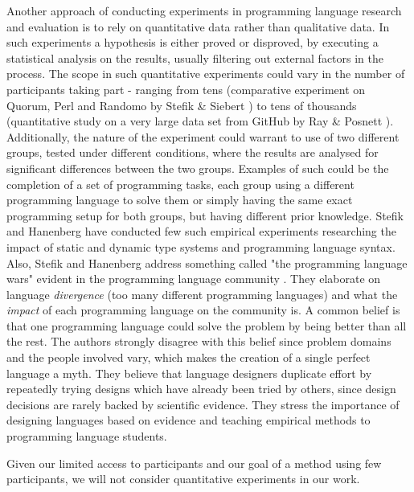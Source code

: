 Another approach of conducting experiments in programming language research and evaluation is to rely on quantitative data rather than qualitative data. In such experiments a hypothesis is either proved or disproved, by executing a statistical analysis on the results, usually filtering out external factors in the process. The scope in such quantitative experiments could vary in the number of participants taking part - ranging from tens (comparative experiment on Quorum, Perl and Randomo by Stefik \& Siebert \cite{QuorumRandomo}) to tens of thousands (quantitative study on a very large data set from GitHub by Ray \& Posnett \cite{GitHubExperiment}). Additionally, the nature of the experiment could warrant to use of two different groups, tested under different conditions, where the results are analysed for significant differences between the two groups. Examples of such could be the completion of a set of programming tasks, each group using a different programming language to solve them or simply having the same exact programming setup for both groups, but having different prior knowledge. Stefik and Hanenberg have conducted few such empirical experiments \cite{StaticTypes}\cite{ProgLangSyntax} researching the impact of static and dynamic type systems and programming language syntax. Also, Stefik and Hanenberg address something called "the programming language wars" evident in the programming language community \cite{ProgrammingWars}. They elaborate on language \textit{divergence} (too many different programming languages) and what the \textit{impact} of each programming language on the community is. A common belief is that one programming language could solve the problem by being better than all the rest. The authors strongly disagree with this belief since problem domains and the people involved vary, which makes the creation of a single perfect language a myth. They believe that language designers duplicate effort by repeatedly trying designs which have already been tried by others, since design decisions are rarely backed by scientific evidence. They stress the importance of designing languages based on evidence and teaching empirical methods to programming language students.

Given our limited access to participants and our goal of a method using few participants, we will not consider quantitative experiments in our work.
